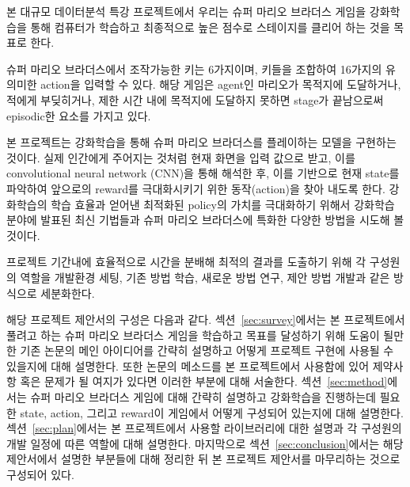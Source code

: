 본 대규모 데이터분석 특강 프로젝트에서 우리는 슈퍼 마리오 브라더스 게임을 강화학습을 통해 컴퓨터가 학습하고 최종적으로 높은 점수로 스테이지를 클리어 하는 것을 목표로 한다.

슈퍼 마리오 브라더스에서 조작가능한 키는 6가지이며, 키들을 조합하여 16가지의 유의미한 action을 입력할 수 있다.
해당 게임은 agent인 마리오가 목적지에 도달하거나, 적에게 부딪히거나, 제한 시간 내에 목적지에 도달하지 못하면 stage가 끝남으로써 episodic한 요소를 가지고 있다. 

본 프로젝트는 강화학습을 통해 슈퍼 마리오 브라더스를 플레이하는 모델을 구현하는 것이다.
실제 인간에게 주어지는 것처럼 현재 화면을 입력 값으로 받고, 이를 convolutional neural network (CNN)을 통해 해석한 후, 이를 기반으로 현재 state를 파악하여 앞으로의 reward를 극대화시키기 위한 동작(action)을 찾아 내도록 한다.
강화학습의 학습 효율과 얻어낸 최적화된 policy의 가치를 극대화하기 위해서 강화학습 분야에 발표된 최신 기법들과 슈퍼 마리오 브라더스에 특화한 다양한 방법을 시도해 볼 것이다.

프로젝트 기간내에 효율적으로 시간을 분배해 최적의 결과를 도출하기 위해 각 구성원의 역할을 개발환경 세팅, 기존 방법 학습, 새로운 방법 연구, 제안 방법 개발과 같은 방식으로 세분화한다.

해당 프로젝트 제안서의 구성은 다음과 같다. 
섹션~\ref{sec:survey}에서는 본 프로젝트에서 풀려고 하는 슈퍼 마리오 브라더스 게임을 학습하고 목표를 달성하기 위해 도움이 될만한 기존 논문의 메인 아이디어를 간략히 설명하고 어떻게 프로젝트 구현에 사용될 수 있을지에 대해 설명한다. 
또한 논문의 메소드를 본 프로젝트에서 사용함에 있어 제약사항 혹은 문제가 될 여지가 있다면 이러한 부분에 대해 서술한다. 
섹션~\ref{sec:method}에서는 슈퍼 마리오 브라더스 게임에 대해 간략히 설명하고 강화학습을 진행하는데 필요한 state, action, 그리고 reward이 게임에서 어떻게 구성되어 있는지에 대해 설명한다. 
섹션~\ref{sec:plan}에서는 본 프로젝트에서 사용할 라이브러리에 대한 설명과 각 구성원의 개발 일정에 따른 역할에 대해 설명한다. 
마지막으로 섹션~\ref{sec:conclusion}에서는 해당 제안서에서 설명한 부분들에 대해 정리한 뒤 본 프로젝트 제안서를 마무리하는 것으로 구성되어 있다.
